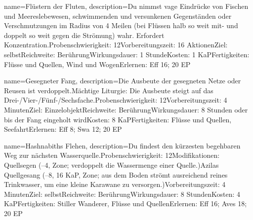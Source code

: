 {
    name={Flüstern der Fluten},
    description={Du nimmst vage Eindrücke von Fischen und Meereslebewesen, schwimmenden und versunkenen Gegenständen oder Verschmutzungen im Radius von 4 Meilen (bei Flüssen halb so weit mit- und doppelt so weit gegen die Strömung) wahr. Erfordert Konzentration.\newline Probenschwierigkeit: 12\newline Vorbereitungszeit: 16 Aktionen\newline Ziel: selbst\newline Reichweite: Berührung\newline Wirkungsdauer: 1 Stunde\newline Kosten: 1 KaP\newline Fertigkeiten: Flüsse und Quellen, Wind und Wogen\newline Erlernen: Eff 16; 20 EP}
}


{
    name={Gesegneter Fang},
    description={Die Ausbeute der gesegneten Netze oder Reusen ist verdoppelt.\newline Mächtige Liturgie: Die Ausbeute steigt auf das Drei-/Vier-/Fünf-/Sechsfache.\newline Probenschwierigkeit: 12\newline Vorbereitungszeit: 4 Minuten\newline Ziel: Einzelobjekt\newline Reichweite: Berührung\newline Wirkungsdauer: 8 Stunden oder bis der Fang eingeholt wird\newline Kosten: 8 KaP\newline Fertigkeiten: Flüsse und Quellen, Seefahrt\newline Erlernen: Eff 8; Swa 12; 20 EP}
}


{
    name={Hashnabiths Flehen},
    description={Du findest den kürzesten begehbaren Weg zur nächsten Wasserquelle.\newline Probenschwierigkeit: 12\newline Modifikationen: Quellsegen (–4, Zone; verdoppelt die Wassermenge einer Quelle.)\newline Azilas Quellgesang (–8, 16 KaP, Zone; aus dem Boden strömt ausreichend reines Trinkwasser, um eine kleine Karawane zu versorgen.)\newline Vorbereitungszeit: 4 Minuten\newline Ziel: selbst\newline Reichweite: Berührung\newline Wirkungsdauer: 8 Stunden\newline Kosten: 4 KaP\newline Fertigkeiten: Stiller Wanderer, Flüsse und Quellen\newline Erlernen: Eff 16; Aves 18; 20 EP}
}


